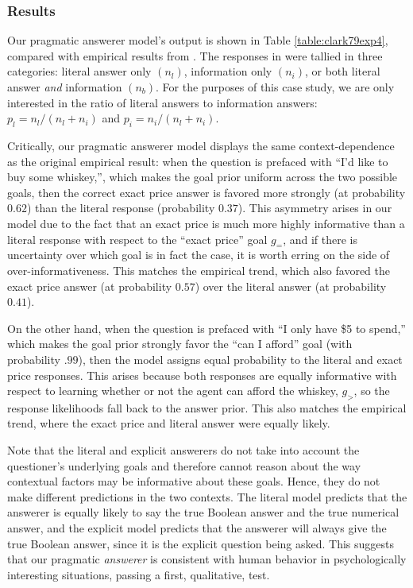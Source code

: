 \documentclass[12pt, floatsintext, jou]{apa6}
\begin{document}
\subsubsection{Results} 

Our pragmatic answerer model's output is shown in Table \ref{table:clark79exp4}, compared with empirical results from . The responses in  were tallied in three categories: literal answer only $(n_l)$, information only $(n_i)$, or both literal answer \emph{and} information $(n_b)$. For the purposes of this case study, we are only interested in the ratio of literal answers to information answers: $p_l = n_l/(n_l+n_i)$ and $p_i = n_i/(n_l+n_i)$.

Critically, our pragmatic answerer model displays the same context-dependence as the original empirical result: when the question is prefaced with ``I'd like to buy some whiskey,'', which makes the goal prior uniform across the two possible goals, then the correct exact price answer is favored more strongly (at probability $0.62$) than the literal response (probability $0.37$). This asymmetry arises in our model due to the fact that an exact price is much more highly informative than a literal response with respect to the ``exact price'' goal $g_=$, and if there is uncertainty over which goal is in fact the case, it is worth erring on the side of over-informativeness. This matches the empirical trend, which also favored the exact price answer (at probability $0.57$) over the literal answer (at probability $0.41$).

On the other hand, when the question is prefaced with ``I only have \$5 to spend,'' which makes the goal prior strongly favor the ``can I afford'' goal (with probability $.99$), then the model assigns equal probability to the literal and exact price responses. This arises because both responses are equally informative with respect to learning whether or not the agent can afford the whiskey, $g_>$, so the response likelihoods fall back to the answer prior. This also matches the empirical trend, where the exact price and literal answer were equally likely.

Note that the literal and explicit answerers do not take into account the questioner's underlying goals and therefore cannot reason about the way contextual factors may be informative about these goals. Hence, they do not make different predictions in the two contexts. The literal model predicts that the answerer is equally likely to say the true Boolean answer and the true numerical answer, and the explicit model predicts that the answerer will always give the true Boolean answer, since it is the explicit question being asked. This suggests that our pragmatic \emph{answerer} is consistent with human behavior in psychologically interesting situations, passing a first, qualitative, test. 
\end{document}
